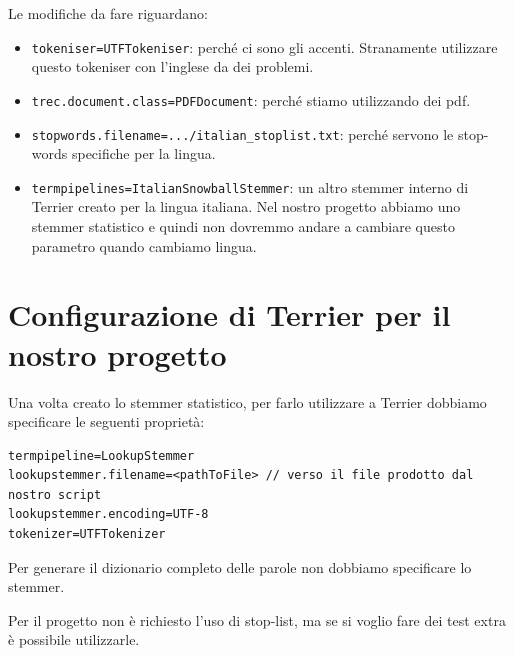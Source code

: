 Le modifiche da fare riguardano:

\begin{itemize}
	\item \texttt{tokeniser=UTFTokeniser}: perché ci sono gli accenti. Stranamente utilizzare questo tokeniser con l'inglese da dei problemi.
	\item \texttt{trec.document.class=PDFDocument}: perché stiamo utilizzando dei pdf.
	\item \texttt{stopwords.filename=.../italian\_stoplist.txt}: perché servono le stop-words specifiche per la lingua.
	\item \texttt{termpipelines=ItalianSnowballStemmer}: un altro stemmer interno di Terrier creato per la lingua italiana. Nel nostro progetto abbiamo uno stemmer statistico e quindi non dovremmo andare a cambiare questo parametro quando cambiamo lingua.
\end{itemize}

\section{Configurazione di Terrier per il nostro progetto}

Una volta creato lo stemmer statistico, per farlo utilizzare a Terrier dobbiamo specificare le seguenti proprietà:

\begin{lstlisting}
termpipeline=LookupStemmer
lookupstemmer.filename=<pathToFile> // verso il file prodotto dal nostro script
lookupstemmer.encoding=UTF-8
tokenizer=UTFTokenizer
\end{lstlisting}

\noindent Per generare il dizionario completo delle parole non dobbiamo specificare lo stemmer.

Per il progetto non è richiesto l'uso di stop-list, ma se si voglio fare dei test extra è possibile utilizzarle.



